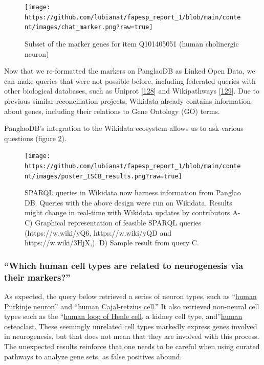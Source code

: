\begin{figure}
\hypertarget{fig:chat_marker}{%
\centering
\texttt{[image: https://github.com/lubianat/fapesp\_report\_1/blob/main/content/images/chat\_marker.png?raw=true]}
\caption{Subset of the marker genes for item Q101405051 (human cholinergic neuron)}\label{fig:chat_marker}
}
\end{figure}

Now that we re-formatted the markers on PanglaoDB as Linked Open Data, we can make queries that were not possible before, including federated queries with other biological databases, such as Uniprot {[}\protect\hyperlink{ref-HUJ9NzAb}{128}{]}
and Wikipathways {[}\protect\hyperlink{ref-AgOOCR24}{129}{]}.
Due to previous similar reconciliation projects, Wikidata already contains information about genes, including their relations to Gene Ontology (GO) terms.

PanglaoDB's integration to the Wikidata ecosystem allows us to ask various questions (figure \ref{fig:iscb_results}).

\begin{figure}
\hypertarget{fig:iscb_results}{%
\centering
\texttt{[image: https://github.com/lubianat/fapesp\_report\_1/blob/main/content/images/poster\_ISCB\_results.png?raw=true]}
\caption{SPARQL queries in Wikidata now harness information from Panglao DB. Queries with the above design were run on Wikidata. Results might change in real-time with Wikidata updates by contributors A-C) Graphical representation of feasible SPARQL queries (https://w.wiki/yQ6, https://w.wiki/yQD and https://w.wiki/3HjX,). D) Sample result from query C.}\label{fig:iscb_results}
}
\end{figure}

\hypertarget{which-human-cell-types-are-related-to-neurogenesis-via-their-markers}{%
\subsubsection{``Which human cell types are related to neurogenesis via their markers?''}\label{which-human-cell-types-are-related-to-neurogenesis-via-their-markers}}

As expected, the query below retrieved a series of neuron types, such as ``\href{https://www.wikidata.org/wiki/Q101404913}{human Purkinje neuron}'' and ``\href{https://www.wikidata.org/wiki/Q101405091}{human Cajal-retzius cell}.'' It also retrieved non-neural cell types such as the ``\href{https://www.wikidata.org/wiki/Q101405109}{human loop of Henle cell}, a kidney cell type, and''\href{https://www.wikidata.org/wiki/Q101404928}{human osteoclast}.
These seemingly unrelated cell types markedly express genes involved in neurogenesis, but that does not mean that they are involved with this process.
The unexpected results reinforce that one needs to be careful when using curated pathways to analyze gene sets, as false positives abound.

